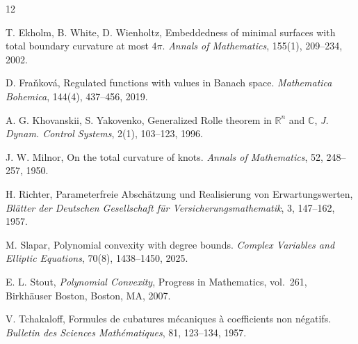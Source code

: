 \documentclass[reqno]{amsart}
\theoremstyle{definition}
\numberwithin{equation}{section}
\begin{document}
\begin{thebibliography}{12}

T. Ekholm, B. White, D. Wienholtz, Embeddedness of minimal surfaces with total boundary curvature at most $4\pi$. \textit{Annals of Mathematics}, 155(1), 209--234, 2002.

 D. Fra\v nkov\'a, Regulated functions with values in Banach space.
  \textit{Mathematica Bohemica}, 144(4), 437--456, 2019.

A. G. Khovanskii, S. Yakovenko, Generalized Rolle theorem in $\mathbb{R}^n$ and $\mathbb{C}$, \textit{J. Dynam. Control Systems}, 2(1), 103--123, 1996.
 
 J. W. Milnor, On the total curvature of knots. \textit{Annals of Mathematics}, 52, 248--257, 1950.

 H. Richter, Parameterfreie Absch\"atzung und Realisierung von
Erwartungswerten, \textit{Bl\"atter der Deutschen Gesellschaft
f\"ur Versicherungsmathematik}, 3, 147--162, 1957.

 M. Slapar, Polynomial convexity with degree bounds. \textit{Complex Variables and Elliptic Equations}, 70(8), 1438--1450, 2025.

 E. L. Stout, \emph{Polynomial Convexity}, Progress in Mathematics, vol.~261, Birkh\"auser Boston, Boston, MA, 2007.

 V. Tchakaloff, Formules de cubatures m\'ecaniques \`a coefficients non n\'egatifs. \textit{Bulletin des Sciences Math\'ematiques}, 81, 123--134, 1957.

\end{thebibliography}
\end{document}
